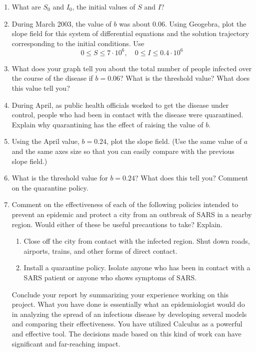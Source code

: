 \documentclass
[justified,nohyper]
{tufte-handout}
\begin{document}
\begin{enumerate}
  \item What are $S_0$ and $I_0$, the initial values of $S$ and $I$?
  \item During March 2003, the value of $b$ was about 0.06. Using Geogebra, plot the slope field for this system of differential equations and the solution trajectory corresponding to the initial conditions. Use \[0\leq S \leq 7\cdot 10^{6},\quad 0\leq I \leq 0.4\cdot 10^{6}\]
  \item What does your graph tell you about the total number of people infected over the course of the disease if $b=0.06$? What is the threshold value? What does this value tell you?
  \item During April, as public health officials worked to get the disease under control, people who had been in contact with the disease were quarantined. Explain why quarantining has the effect of raising the value of $b$.
  \item Using the April value, $b=0.24$, plot the slope field. (Use the same value of $a$ and the same axes size so that you can easily compare with the previous slope field.)
  \item What is the threshold value for $b=0.24$? What does this tell you? Comment on the quarantine policy.
  \item Comment on the effectiveness of each of the following policies intended to prevent an epidemic and protect a city from an outbreak of SARS in a nearby region. Would either of these be useful precautions to take? Explain.
  \begin{enumerate}
  \item Close off the city from contact with the infected region. Shut down roads, airports, trains, and other forms of direct contact.
  \item Install a quarantine policy. Isolate anyone who has been in contact with a SARS patient or anyone who shows symptoms of SARS.
\end{enumerate}

Conclude your report by summarizing your experience working on this project. What you have done is essentially what an epidemiologist would do in analyzing the spread of an infectious disease by developing several models and comparing their effectiveness. You have utilized Calculus as a powerful and effective tool. The decisions made based on this kind of work can have significant and far-reaching impact.

\end{enumerate}
\end{document}
